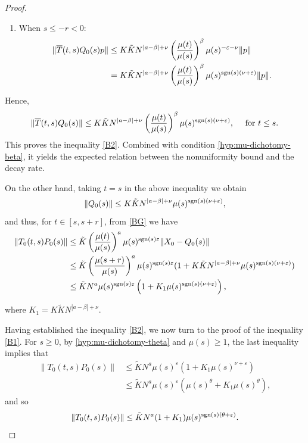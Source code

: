 \documentclass[9pt]{amsart}
\numberwithin{equation}{section}
\numberwithin{lemma}{section}
\begin{document}
\begin{proof}
\begin{enumerate}
        \item[(ii)] When $s\leq -r< 0$:
        \begin{align*}
           \|\overline{T}(t,s)Q_0(s)p\| &\leq K\tilde{K}N^{|a-\beta|+\nu}\left(\frac{\mu(t)}{\mu(s)}\right)^{\beta}\mu(s)^{-\varepsilon-\nu}\|p\|\\
           &= K\tilde{K}N^{|a-\beta|+\nu}\left(\frac{\mu(t)}{\mu(s)}\right)^{\beta}\mu(s)^{\textnormal{sgn}(s)(\nu+\varepsilon)}\|p\|.
        \end{align*}
    \end{enumerate}
    Hence,
    $$\|\overline{T}(t,s)Q_0(s)\| \leq K\tilde{K}N^{|a-\beta|+\nu}\left(\frac{\mu(t)}{\mu(s)}\right)^{\beta}\mu(s)^{\textnormal{sgn}(s)(\nu+\varepsilon)}, \quad \textnormal{ for } t\leq s.$$
   This proves the inequality \eqref{B2}. Combined with condition \eqref{hyp:mu-dichotomy-beta}, it yields the expected relation between the nonuniformity bound and the decay rate.

    
On the other hand, taking $t=s$ in the above inequality we obtain
    $$\|Q_0(s)\|\leq K\tilde{K}N^{|a-\beta|+\nu}\mu(s)^{\textnormal{sgn}(s)(\nu+\varepsilon)},$$
    and thus, for $t\in[s,s+r]$, from \eqref{BG} we have
    \begin{align*}
        \|T_0(t,s)P_0(s)\| &\leq \tilde{K}\left(\frac{\mu(t)}{\mu(s)}\right)^{a}\mu(s)^{\textnormal{sgn}(s)\varepsilon}\|X_0-Q_0(s)\|\\
        &\leq \tilde{K}\left(\frac{\mu(s+r)}{\mu(s)}\right)^{a}\mu(s)^{\textnormal{sgn}(s)\varepsilon}(1+K\tilde{K}N^{|a-\beta|+\nu}\mu(s)^{\textnormal{sgn}(s)(\nu+\varepsilon)})\\
        &\leq \tilde{K}N^{a}\mu(s)^{\textnormal{sgn}(s)\varepsilon}\left(1+K_1\mu(s)^{\textnormal{sgn}(s)(\nu+\varepsilon)}\right),
    \end{align*}

    where $K_1=K\tilde{K}N^{|a-\beta|+\nu}$.
    
    Having established the inequality \eqref{B2}, we now turn to the proof of the inequality \eqref{B1}. For $s\geq0$, by \eqref{hyp:mu-dichotomy-theta} and $\mu(s)\geq1$, the last inequality implies that
    \begin{align*}
        \|T_0(t,s)P_0(s)\| &\leq \tilde{K}N^{a}\mu(s)^{\varepsilon}(1+K_1\mu(s)^{\nu+\varepsilon})\\
        &\leq \tilde{K}N^{a}\mu(s)^{\varepsilon}(\mu(s)^{\theta}+K_1\mu(s)^{\theta}),
    \end{align*}
    and so
    \begin{equation}\label{P1-eq1}
        \|T_0(t,s)P_0(s)\| \leq \tilde{K}N^{a}(1+K_1)\mu(s)^{\textnormal{sgn}(s)(\theta+\varepsilon)}.
    \end{equation}
    

\end{proof}
\end{document}
